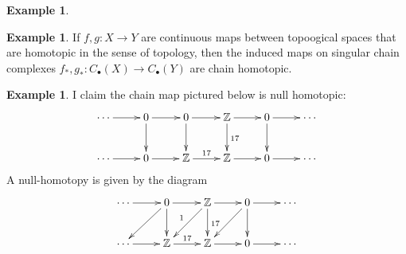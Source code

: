 \documentclass{amsart}[12pt]
\newcommand{\Z}{\mathbb{Z}}
\numberwithin{equation}{section}
\theoremstyle{plain} %
\theoremstyle{definition}
\newtheorem{ex}[equation]{Example}
\theoremstyle{remark}
\begin{document}
\begin{ex}
 
\begin{ex} If $f,g: X \to Y$ are continuous maps between topoogical spaces that are homotopic in the sense of topology, 
then the induced maps on singular chain complexes $f_*, g_*: C_\bullet(X) \to C_\bullet(Y)$ are chain homotopic.
\end{ex}


 \begin{ex} I claim the chain map pictured below is null homotopic:
   $$
   \xymatrix{
     \cdots \ar[r] & 0 \ar[r]\ar[d] &  0 \ar[d] \ar[r] &  \Z \ar[r] \ar[d]^{17} & 0 \ar[r] \ar[d]& \cdots \\
     \cdots \ar[r] & 0 \ar[r] & \Z \ar[r]^{17} &  \Z \ar[r] & 0 \ar[r] & \cdots \\
   }
   $$
   A null-homotopy is given by the diagram
   $$
   \xymatrix{
     \cdots \ar[r] &  0 \ar[d] \ar[r] \ar[dl] &  \Z \ar[r] \ar[d]^{17} \ar[dl]_1 & 0 \ar[r] \ar[d] \ar[dl] & \cdots \\
     \cdots \ar[r] &  \Z \ar[r]^{17} &  \Z \ar[r] & 0 \ar[r] & \cdots \\
   }
   $$
  \end{ex}
   

\end{ex}
\end{document}
